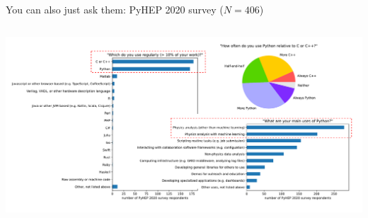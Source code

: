 \documentclass[aspectratio=169]{beamer}
\begin{document}
\begin{frame}{You can also just ask them: PyHEP 2020 survey ($N=406$)}
\vspace{0.5 cm}
\begin{columns}
\includegraphics[width=\linewidth]{PLOTS/pyhep2020-survey-5.pdf}
\end{columns}
\end{frame}
\end{document}
